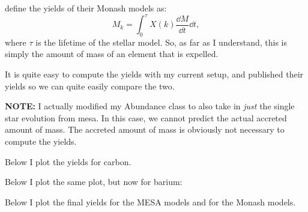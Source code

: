 \documentclass[a4paper,10pt]{article}
\begin{document}
\begin{figure}[ht]
    \centering
\end{figure}


\citet{karakas2016} define the yields of their Monash models as:
\begin{equation*}
    M_{k} = \int_{0}^{\tau } X(k)\frac{\dd{M}}{\dd{t}}\dd{t},
\end{equation*}
where \(\tau \) is the lifetime of the stellar model.
So, as far as I understand, this is simply the amount of mass of an element that is expelled.

It is quite easy to compute the yields with my current setup, and \citet{karakas2016} published their yields so we can quite easily compare the two.

\begin{questionbox}{}{}
\textbf{\textcolor{keywordscolor}{NOTE:}}
    I actually modified my Abundance class to also take in \emph{just} the single star evolution from mesa. In this case, we cannot predict the actual accreted amount of mass. The accreted amount of mass is obviously not necessary to compute the yields.
\end{questionbox}

Below I plot the yields for carbon. 
\begin{figure}[ht]
    \centering
\end{figure}

Below I plot the same plot, but now for barium:

\begin{figure}[ht]
    \centering
\end{figure}

Below I plot the final yields for the MESA models and for the Monash models.

\begin{figure}[ht]
    \centering
\end{figure}
\end{document}
